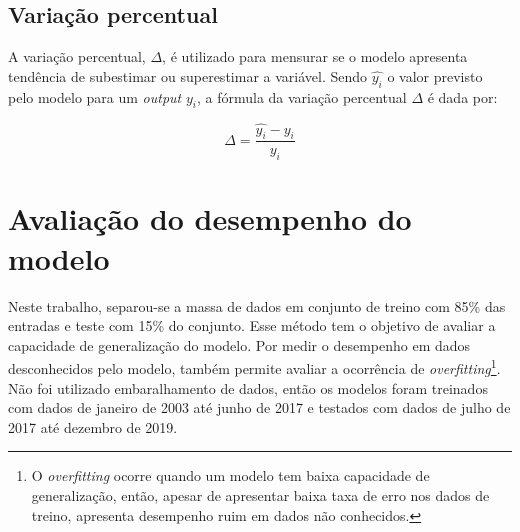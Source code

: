 \subsection{Variação percentual}

A variação percentual, $\Delta$, é utilizado para mensurar se o 
modelo apresenta tendência de subestimar ou superestimar a variável. 
Sendo $\hat{y_i}$ o valor previsto pelo 
modelo para um \textit{output} $y_i$, a fórmula da variação percentual
$\Delta$ é dada por:

\begin{equation}
    \Delta = \frac{\hat{y_i} - y_i}{y_i}
\end{equation}

\section{Avaliação do desempenho do modelo}

Neste trabalho, separou-se a massa de dados em conjunto de treino com 85\% 
das entradas e teste com 15\% do conjunto. Esse método tem o objetivo de avaliar
a capacidade de generalização do modelo. Por medir o desempenho em dados 
desconhecidos pelo modelo, também permite avaliar a ocorrência de \textit{overfitting}\footnote{
O \textit{overfitting} ocorre quando um modelo tem baixa capacidade de generalização, 
então, apesar de apresentar baixa taxa de erro nos dados de treino, apresenta 
desempenho ruim em dados não conhecidos.}. Não foi utilizado embaralhamento de dados, 
então os modelos foram treinados com dados de janeiro de 2003 até junho de 2017
e testados com dados de julho de 2017 até dezembro de 2019.
